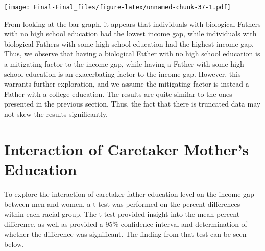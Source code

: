 \documentclass[
]{article}
\begin{document}
\texttt{[image: Final-Final\_files/figure-latex/unnamed-chunk-37-1.pdf]}

From looking at the bar graph, it appears that individuals with
biological Fathers with no high school education had the lowest income
gap, while individuals with biological Fathers with some high school
education had the highest income gap. Thus, we observe that having a
biological Father with no high school education is a mitigating factor
to the income gap, while having a Father with some high school education
is an exacerbating factor to the income gap. However, this warrants
further exploration, and we assume the mitigating factor is instead a
Father with a college education. The results are quite similar to the
ones presented in the previous section. Thus, the fact that there is
truncated data may not skew the results significantly.

\hypertarget{interaction-of-caretaker-mothers-education}{%
\section{Interaction of Caretaker Mother's
Education}\label{interaction-of-caretaker-mothers-education}}

To explore the interaction of caretaker father education level on the
income gap between men and women, a t-test was performed on the percent
differences within each racial group. The t-test provided insight into
the mean percent difference, as well as provided a 95\% confidence
interval and determination of whether the difference was significant.
The finding from that test can be seen below.
\end{document}
